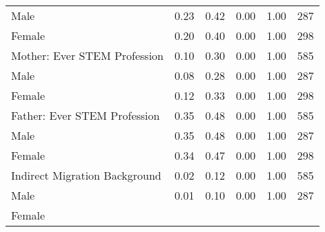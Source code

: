\documentclass{article}
\begin{document}
\begin{table}[ht]
{\begin{tabular}{llllll}
\multicolumn{1}{l}{\hspace{1em}Male} &
  \multicolumn{1}{r}{0.23} &
  \multicolumn{1}{r}{0.42} &
  \multicolumn{1}{r}{0.00} &
  \multicolumn{1}{r}{1.00} &
  \multicolumn{1}{r}{287} \\
\multicolumn{1}{l}{\hspace{1em}Female} &
  \multicolumn{1}{r}{0.20} &
  \multicolumn{1}{r}{0.40} &
  \multicolumn{1}{r}{0.00} &
  \multicolumn{1}{r}{1.00} &
  \multicolumn{1}{r}{298} \\
\multicolumn{1}{l}{Mother: Ever STEM Profession} &
  \multicolumn{1}{r}{0.10} &
  \multicolumn{1}{r}{0.30} &
  \multicolumn{1}{r}{0.00} &
  \multicolumn{1}{r}{1.00} &
  \multicolumn{1}{r}{585} \\
\multicolumn{1}{l}{\hspace{1em}Male} &
  \multicolumn{1}{r}{0.08} &
  \multicolumn{1}{r}{0.28} &
  \multicolumn{1}{r}{0.00} &
  \multicolumn{1}{r}{1.00} &
  \multicolumn{1}{r}{287} \\
\multicolumn{1}{l}{\hspace{1em}Female} &
  \multicolumn{1}{r}{0.12} &
  \multicolumn{1}{r}{0.33} &
  \multicolumn{1}{r}{0.00} &
  \multicolumn{1}{r}{1.00} &
  \multicolumn{1}{r}{298} \\
\multicolumn{1}{l}{Father: Ever STEM Profession} &
  \multicolumn{1}{r}{0.35} &
  \multicolumn{1}{r}{0.48} &
  \multicolumn{1}{r}{0.00} &
  \multicolumn{1}{r}{1.00} &
  \multicolumn{1}{r}{585} \\
\multicolumn{1}{l}{\hspace{1em}Male} &
  \multicolumn{1}{r}{0.35} &
  \multicolumn{1}{r}{0.48} &
  \multicolumn{1}{r}{0.00} &
  \multicolumn{1}{r}{1.00} &
  \multicolumn{1}{r}{287} \\
\multicolumn{1}{l}{\hspace{1em}Female} &
  \multicolumn{1}{r}{0.34} &
  \multicolumn{1}{r}{0.47} &
  \multicolumn{1}{r}{0.00} &
  \multicolumn{1}{r}{1.00} &
  \multicolumn{1}{r}{298} \\
\multicolumn{1}{l}{Indirect Migration Background} &
  \multicolumn{1}{r}{0.02} &
  \multicolumn{1}{r}{0.12} &
  \multicolumn{1}{r}{0.00} &
  \multicolumn{1}{r}{1.00} &
  \multicolumn{1}{r}{585} \\
\multicolumn{1}{l}{\hspace{1em}Male} &
  \multicolumn{1}{r}{0.01} &
  \multicolumn{1}{r}{0.10} &
  \multicolumn{1}{r}{0.00} &
  \multicolumn{1}{r}{1.00} &
  \multicolumn{1}{r}{287} \\
\multicolumn{1}{l}{\hspace{1em}Female} &

\end{tabular}}
\end{table}
\end{document}
